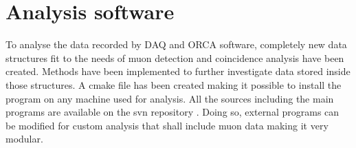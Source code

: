 
\chapter{Analysis software}
\label{ch:Analysis software}
  To analyse the data recorded by DAQ and ORCA software, completely new data structures fit to the needs of muon detection and coincidence analysis have been created. 
  Methods have been implemented to further investigate data stored inside those structures.
  A cmake file has been created making it possible to install the program on any machine used for analysis. All the sources including the main programs are available on the svn repository .
  Doing so, external programs can be modified for custom analysis that shall include muon data making it very modular.
